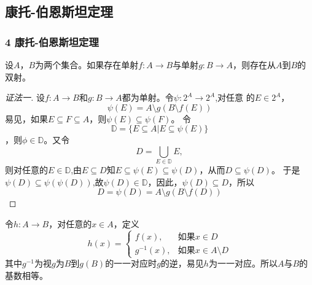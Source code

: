 \documentclass{beamer}
\begin{document}
\begin{CJK*}{UTF8}{gbsn}
\section{康托-伯恩斯坦定理}
\begin{frame}
  \frametitle{4 康托-伯恩斯坦定理}
  \begin{Thm}[康托-伯恩斯坦]
    设$A$，$B$为两个集合。如果存在单射$f:A\to B$与单射$g:B\to A$，则存在从$A$到$B$的双射。
  \end{Thm}
  \begin{proof}[证法一]{\small
    设$f:A\to B$和$g:B\to A$都为单射。令$\psi:2^A\to 2^A$,对任意
    的$E\in 2^A$，\[\psi(E)=A\setminus g(B\setminus f(E))\]易见，如果$E\subseteq F\subseteq A$，则$\psi(E)\subseteq \psi(F)$。
    令\[\mathbb{D}=\{E\subseteq A|E\subseteq \psi(E)\}\]，则$\phi\in \mathbb{D}$。又令
    \[D=\bigcup_{E\in \mathbb{D}}E,\]
    则对任意的$E\in \mathbb{D}$,由$E\subseteq D$知$E\subseteq \psi(E) \subseteq \psi(D)$，从而$D\subseteq \psi(D)$。
    于是$\psi(D)\subseteq \psi(\psi(D))$,故$\psi(D)\in \mathbb{D}$，因此，$\psi(D)\subseteq D$，所以
    \[D=\psi(D)=A\setminus g(B\setminus f(D))\]}
  \end{proof}
\end{frame}
\begin{frame}
  令$h:A\to B$，对任意的$x\in A$，定义
  \[h(x)=\begin{cases}
      f(x),&\text{如果}x\in D\\
      g^{-1}(x),&\text{如果}x\in A\setminus D
    \end{cases}
  \]
  其中$g^{-1}$为视$g$为$B$到$g(B)$的一一对应时$g$的逆，易见$h$为一一对应。所以$A$与$B$的基数相等。
\end{frame}



\end{CJK*}
\end{document}
